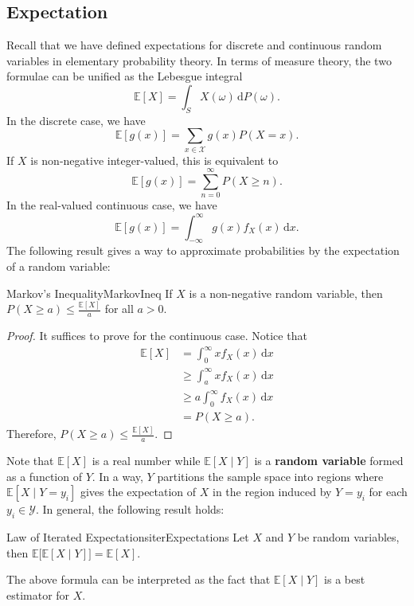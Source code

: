 \documentclass[math, code]{amznotes}
\theoremstyle{remark}
\renewcommand{\d}{\mathrm{d}}
\begin{document}
\subsection{Expectation}
Recall that we have defined expectations for discrete and continuous random variables in elementary probability theory. In terms of measure theory, the two formulae can be unified as the Lebesgue integral
\begin{equation*}
    \mathbb{E}[X] = \int_{S}\!X\left(\omega\right)\,\d P\left(\omega\right).
\end{equation*}
In the discrete case, we have 
\begin{equation*}
    \mathbb{E}\left[g\left(x\right)\right] = \sum_{x \in \mathcal{X}}g\left(x\right)P\left(X = x\right).
\end{equation*}
If $X$ is non-negative integer-valued, this is equivalent to 
\begin{equation*}
    \mathbb{E}\left[g\left(x\right)\right] = \sum_{n = 0}^{\infty}P\left(X \geq n\right).
\end{equation*}
In the real-valued continuous case, we have 
\begin{equation*}
    \mathbb{E}\left[g\left(x\right)\right] = \int_{-\infty}^{\infty}\!g\left(x\right)f_X\left(x\right)\,\d x.
\end{equation*}
The following result gives a way to approximate probabilities by the expectation of a random variable:
\begin{thmbox}{Markov's Inequality}{MarkovIneq}
    If $X$ is a non-negative random variable, then $P\left(X \geq a\right) \leq \frac{\mathbb{E}[X]}{a}$ for all $a > 0$.
    \tcblower
    \begin{proof}
        It suffices to prove for the continuous case. Notice that 
        \begin{align*}
            \mathbb{E}[X] & = \int_{0}^{\infty}\!xf_X\left(x\right)\,\d x \\
            & \geq \int_{a}^{\infty}\!xf_X\left(x\right)\,\d x \\
            & \geq a\int_{0}^{\infty}\!f_X\left(x\right)\,\d x \\
            & = P\left(X \geq a\right).
        \end{align*}
        Therefore, $P\left(X \geq a\right) \leq \frac{\mathbb{E}[X]}{a}$.
    \end{proof}
\end{thmbox}
Note that $\mathbb{E}[X]$ is a real number while $\mathbb{E}[X \mid Y]$ is a \textbf{random variable} formed as a function of $Y$. In a way, $Y$ partitions the sample space into regions where $\mathbb{E}[X \mid Y = y_i]$ gives the expectation of $X$ in the region induced by $Y = y_i$ for each $y_i \in \mathcal{Y}$. In general, the following result holds:
\begin{thmbox}{Law of Iterated Expectations}{iterExpectations}
    Let $X$ and $Y$ be random variables, then $\mathbb{E}\bigl[\mathbb{E}[X \mid Y]\bigr] = \mathbb{E}[X]$.
\end{thmbox}
The above formula can be interpreted as the fact that $\mathbb{E}[X \mid Y]$ is a best estimator for $X$.
\end{document}
